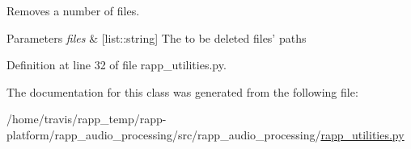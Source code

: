 Removes a number of files. 


\begin{DoxyParams}{Parameters}
{\em files} & \mbox{[}list\-::string\mbox{]} The to be deleted files' paths \\
\hline
\end{DoxyParams}


Definition at line 32 of file rapp\-\_\-utilities.\-py.



The documentation for this class was generated from the following file\-:\begin{DoxyCompactItemize}
\item 
/home/travis/rapp\-\_\-temp/rapp-\/platform/rapp\-\_\-audio\-\_\-processing/src/rapp\-\_\-audio\-\_\-processing/\hyperlink{rapp__audio__processing_2src_2rapp__audio__processing_2rapp__utilities_8py}{rapp\-\_\-utilities.\-py}\end{DoxyCompactItemize}
